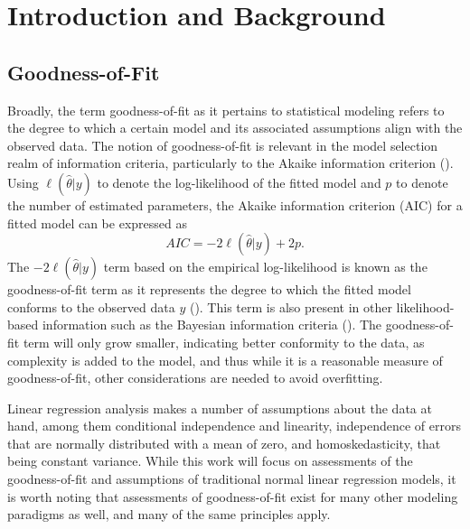 \documentclass[12pt]{article} %
\renewcommand{\theequation}{\thesection\arabic{equation}}
\theoremstyle{definition}
\begin{document}
\def\thefigure{\arabic{figure}}
\def\thetable{\arabic{table}}

\renewcommand{\theequation}{\thesection.\arabic{equation}}


\fontsize{12}{14pt plus.8pt minus .6pt}\selectfont



\section{Introduction and Background}

	\subsection*{Goodness-of-Fit}

    	Broadly, the term goodness-of-fit as it pertains to statistical modeling refers to the degree to which a certain model
		and its associated assumptions align with the observed data. The notion of goodness-of-fit is relevant in the model selection realm of information criteria, particularly to the Akaike
		information criterion (\cite{Akaike}). Using $\ell(\hat{\theta}|y)$ to denote the log-likelihood of the fitted model and $p$ to denote the
		number of estimated parameters, the Akaike information criterion (AIC) for a fitted model can be expressed as
		\begin{equation*}
			AIC = -2 \ell(\hat{\theta}|y) + 2 p.
		\end{equation*}
		The $-2 \ell(\hat{\theta}|y)$ term based on the empirical log-likelihood is known as the goodness-of-fit term as it represents the degree to which the fitted model
		conforms to the observed data $y$ (\cite{Cavanaugh}). This term is also present in other likelihood-based information such as the Bayesian information criteria (\cite{Schwarz}).
		The goodness-of-fit term will only grow smaller, indicating better conformity to the data, as complexity is added to the model, and thus while it is a reasonable measure of
		goodness-of-fit, other considerations are needed to avoid overfitting.

		Linear regression analysis makes a number of assumptions about the data at hand, among them conditional independence and linearity, independence of errors that are normally distributed with a mean of zero,
		and homoskedasticity, that being constant variance. While this work will focus on assessments of the goodness-of-fit and assumptions of traditional normal linear regression models, it is worth noting
		that assessments of goodness-of-fit exist for many other modeling paradigms as well, and many of the same principles apply.
		
\end{document}
